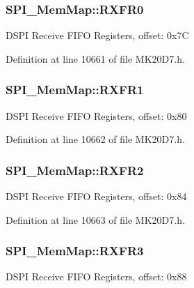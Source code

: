\subsubsection[{\texorpdfstring{R\+X\+F\+R0}{RXFR0}}]{ S\+P\+I\+\_\+\+Mem\+Map\+::\+R\+X\+F\+R0}\hypertarget{struct_s_p_i___mem_map_ad396a1654fca8d4b350357ebcef159af}{}\label{struct_s_p_i___mem_map_ad396a1654fca8d4b350357ebcef159af}
D\+S\+PI Receive F\+I\+FO Registers, offset\+: 0x7C 

Definition at line 10661 of file M\+K20\+D7.\+h.

\subsubsection[{\texorpdfstring{R\+X\+F\+R1}{RXFR1}}]{ S\+P\+I\+\_\+\+Mem\+Map\+::\+R\+X\+F\+R1}\hypertarget{struct_s_p_i___mem_map_a40b7b381e217d2602c20861e371511fd}{}\label{struct_s_p_i___mem_map_a40b7b381e217d2602c20861e371511fd}
D\+S\+PI Receive F\+I\+FO Registers, offset\+: 0x80 

Definition at line 10662 of file M\+K20\+D7.\+h.

\subsubsection[{\texorpdfstring{R\+X\+F\+R2}{RXFR2}}]{ S\+P\+I\+\_\+\+Mem\+Map\+::\+R\+X\+F\+R2}\hypertarget{struct_s_p_i___mem_map_a3839ee0fb2cf1f0389bdaf447dcd6760}{}\label{struct_s_p_i___mem_map_a3839ee0fb2cf1f0389bdaf447dcd6760}
D\+S\+PI Receive F\+I\+FO Registers, offset\+: 0x84 

Definition at line 10663 of file M\+K20\+D7.\+h.

\subsubsection[{\texorpdfstring{R\+X\+F\+R3}{RXFR3}}]{ S\+P\+I\+\_\+\+Mem\+Map\+::\+R\+X\+F\+R3}\hypertarget{struct_s_p_i___mem_map_adb8a4cbc6bff3380d9e817e5bb0e4fee}{}\label{struct_s_p_i___mem_map_adb8a4cbc6bff3380d9e817e5bb0e4fee}
D\+S\+PI Receive F\+I\+FO Registers, offset\+: 0x88 

